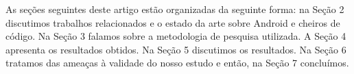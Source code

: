 As se\c{c}\~oes seguintes deste artigo est\~ao organizadas da seguinte forma: na Se\c{c}\~ao 2 discutimos trabalhos relacionados e o estado da arte sobre Android e cheiros de c\'odigo. Na Se\c{c}\~ao 3 falamos sobre a metodologia de pesquisa utilizada. A Se\c{c}\~ao 4 apresenta os resultados obtidos. Na Se\c{c}\~ao 5 discutimos os resultados. Na Se\c{c}\~ao 6 tratamos das amea\c{c}as \`a validade do nosso estudo e ent\~ao, na Se\c{c}\~ao 7 conclu\'imos.
